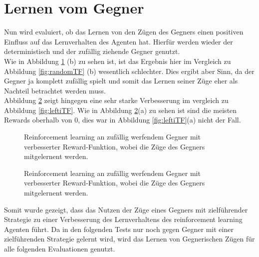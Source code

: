 \section{Lernen vom Gegner}
Nun wird evaluiert, ob das Lernen von den Zügen des Gegners einen positiven Einfluss auf das Lernverhalten des Agenten hat. Hierfür werden wieder der deterministisch und der zufällig ziehende Gegner genutzt.\\
Wie in Abbildung \ref{fig:randomTT} (b) zu sehen ist, ist das Ergebnis hier im Vergleich zu Abbildung \ref{fig:randomTF} (b) wesentlich schlechter. Dies ergibt aber Sinn, da der Gegner ja komplett zufällig spielt und somit das Lernen seiner Züge eher als Nachteil betrachtet werden muss.\\
Abbildung \ref{fig:leftiTT} zeigt hingegen eine sehr starke Verbesserung im vergleich zu Abbildung \ref{fig:leftiTF}. Wie in Abbildung \ref{fig:leftiTT}(a) zu sehen ist sind die meisten Rewards oberhalb von 0, dies war in Abbildung \ref{fig:leftiTF}(a) nicht der Fall.\\


\begin{figure}%
    \centering
    \qquad
    \caption{Reinforcement learning an zufällig werfendem Gegner mit verbesserter Reward-Funktion, wobei die Züge des Gegners mitgelernent werden.}%
    \label{fig:randomTT}%
\end{figure}

\begin{figure}%
    \centering
    \qquad
    \caption{Reinforcement learning an zufällig werfendem Gegner mit verbesserter Reward-Funktion, wobei die Züge des Gegners mitgelernent werden.}%
    \label{fig:leftiTT}%
\end{figure}

Somit wurde gezeigt, dass das Nutzen der Züge eines Gegners mit zielführender Strategie zu einer Verbesserung des Lernverhaltens des reinforcement learning Agenten führt.
Da in den folgenden Tests nur noch gegen Gegner mit einer zielführenden Strategie gelernt wird, wird das Lernen von Gegnerischen Zügen für alle folgenden Evaluationen genutzt.

